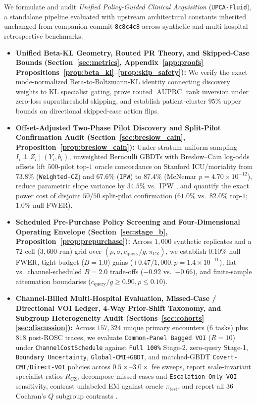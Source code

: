 \documentclass[11pt]{article}
\theoremstyle{remark}
\begin{document}
We formulate and audit \emph{Unified Policy-Guided Clinical Acquisition} (\texttt{UPCA-Fluid}), a standalone pipeline evaluated with upstream architectural constants inherited unchanged from companion commit \texttt{8c8c4c8} across synthetic and multi-hospital retrospective benchmarks:
\begin{itemize}
  \item \textbf{Unified Beta-KL Geometry, Routed PR Theory, and Skipped-Case Bounds (Section~\ref{sec:metrics}, Appendix~\ref{app:proofs} Propositions~\ref{prop:beta_kl}--\ref{prop:skip_safety}):} We verify the exact mode-normalized Beta-to-Boltzmann-KL identity connecting \citet{buja2005loss} discovery weights to KL specialist gating, prove routed $\operatorname{AUPRC}$ rank inversion under zero-loss suprathreshold skipping, and establish patient-cluster $95\%$ upper bounds on directional skipped-case action flips.
  \item \textbf{Offset-Adjusted Two-Phase Pilot Discovery and Split-Pilot Confirmation Audit (Section~\ref{sec:breslow_cain}, Proposition~\ref{prop:breslow_cain}):} Under stratum-uniform sampling $I_i \perp Z_i \mid (Y_i, b_i)$, unweighted Bernoulli GBDTs with Breslow--Cain log-odds offsets lift $500$-pilot top-$1$ oracle concordance on Stanford ICU/mortality from $73.8\%$ (\texttt{Weighted-CZ}) and $67.6\%$ (\texttt{IPW}) to $87.4\%$ (McNemar $p=4.70\times 10^{-12}$), reduce parametric slope variance by $34.5\%$ vs.\ IPW \citep{tao2017efficient}, and quantify the exact power cost of disjoint $50/50$ split-pilot confirmation ($61.0\%$ vs.\ $82.0\%$ top-$1$; $1.0\%$ null FWER).
  \item \textbf{Scheduled Pre-Purchase Policy Screening and Four-Dimensional Operating Envelope (Section~\ref{sec:stage_b}, Proposition~\ref{prop:prepurchase}):} Across $1{,}000$ synthetic replicates and a $72$-cell ($3{,}600$-run) grid over $(\rho, \sigma, c_{\text{query}}/g, \pi_{\text{CZ}})$, we establish $0.10\%$ null FWER, tight-budget ($B=1.0$) gains ($+0.47/1{,}000, p=1.4\times 10^{-11}$), flat vs.\ channel-scheduled $B=2.0$ trade-offs ($-0.92$ vs.\ $-0.66$), and finite-sample attenuation boundaries ($c_{\text{query}}/g \ge 0.90, \rho \le 0.10$).
  \item \textbf{Channel-Billed Multi-Hospital Evaluation, Missed-Case / Directional VOI Ledger, 4-Way Prior-Shift Taxonomy, and Subgroup Heterogeneity Audit (Sections~\ref{sec:cohorts}--\ref{sec:discussion}):} Across $157{,}324$ unique primary encounters ($6$ tasks) plus $818$ post-ROSC traces, we evaluate \texttt{Common-Panel Bagged VOI} ($R=10$) under \texttt{ChannelCostSchedule} against \texttt{Full 100\%} Stage-2, zero-query Stage-1, \texttt{Boundary Uncertainty}, \texttt{Global-CMI+GBDT}, and matched-GBDT \texttt{Covert-CMI}/\texttt{Direct-VOI} policies across $0.5\times\text{--}3.0\times$ fee sweeps, report scale-invariant specialist ratios $R_{\text{CZ}}$, decompose missed cases and \texttt{Escalation-Only VOI} sensitivity, contrast unlabeled \citet{saerens2002adjusting} EM against oracle $\pi_{\text{test}}$, and report all $36$ Cochran's $Q$ subgroup contrasts \citep{collins2024tripodai}.
\end{itemize}
\end{document}
